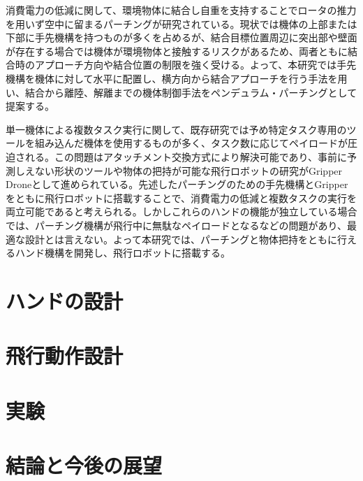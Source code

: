\documentclass{jarticle}
\begin{document}
消費電力の低減に関して、環境物体に結合し自重を支持することでロータの推力を用いず空中に留まるパーチングが研究されている。現状では機体の上部または下部に手先機構を持つものが多くを占めるが、結合目標位置周辺に突出部や壁面が存在する場合では機体が環境物体と接触するリスクがあるため、両者ともに結合時のアプローチ方向や結合位置の制限を強く受ける。よって、本研究では手先機構を機体に対して水平に配置し、横方向から結合アプローチを行う手法を用い、結合から離陸、解離までの機体制御手法をペンデュラム・パーチングとして提案する。

単一機体による複数タスク実行に関して、既存研究では予め特定タスク専用のツールを組み込んだ機体を使用するものが多く、タスク数に応じてペイロードが圧迫される。この問題はアタッチメント交換方式により解決可能であり、事前に予測しえない形状のツールや物体の把持が可能な飛行ロボットの研究がGripper Droneとして進められている。先述したパーチングのための手先機構とGripperをともに飛行ロボットに搭載することで、消費電力の低減と複数タスクの実行を両立可能であると考えられる。しかしこれらのハンドの機能が独立している場合では、パーチング機構が飛行中に無駄なペイロードとなるなどの問題があり、最適な設計とは言えない。よって本研究では、パーチングと物体把持をともに行えるハンド機構を開発し、飛行ロボットに搭載する。



\section{ハンドの設計}

\section{飛行動作設計}

\section{実験}

\section{結論と今後の展望}

\footnotesize





\normalsize
\end{document}
